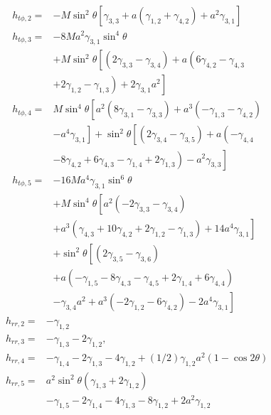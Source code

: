 \begin{eqnarray}
&h_{t\phi,2}=&-M\sin^{2}\theta\left[ \gamma_{3,3}+a\left(\gamma_{1,2}+\gamma_{4,2} \right) +a^{2}\gamma_{3,1} \right] \nonumber\\
&h_{t\phi,3}=&-8Ma^{2}\gamma_{3,1}\sin^{4}\theta \nonumber\\
&&+M\sin^{2}\theta\left[ \left(2\gamma_{3,3}-\gamma_{3,4} \right)+a\left(6\gamma_{4,2}-\gamma_{4,3} \right.\right.\nonumber\\
&&\left.\left.+2\gamma_{1,2}-\gamma_{1,3} \right)+2\gamma_{3,1}a^{2} \right] \nonumber\\
&h_{t\phi,4}= & M\sin^{4}\theta\left[a^{2}\left(8\gamma_{3,1}-\gamma_{3,3} \right)+a^{3}\left(-\gamma_{1,3}-\gamma_{4,2} \right)\right.\nonumber \\
&&\left.-a^{4}\gamma_{3,1} \right] + \sin^{2}\theta \left[  \left( 2\gamma_{3,4}-\gamma_{3,5} \right)+a\left(-\gamma_{4,4}\right.\right.\nonumber\\
&&\left.\left.-8\gamma_{4,2}+6\gamma_{4,3}-\gamma_{1,4}+2\gamma_{1,3} \right)  -a^{2}\gamma_{3,3}  \right] \nonumber\\
&h_{t\phi,5}= & -16Ma^{4}\gamma_{3,1}\sin^{6}\theta\nonumber\\
&&+M\sin^{4}\theta\left[ a^{2}\left(-2\gamma_{3,3}-\gamma_{3,4}\right)\right.\nonumber\\
&&\left.+a^{3}\left(\gamma_{4,3}+10\gamma_{4,2}+2\gamma_{1,2}-\gamma_{1,3}\right) +14a^{4}\gamma_{3,1} \right] \nonumber\\
& &  +\sin^{2}\theta\left[ \left(2\gamma_{3,5}-\gamma_{3,6}\right)\right.\nonumber\\
&&\left.+a\left(-\gamma_{1,5}-8\gamma_{4,3}-\gamma_{4,5}+2\gamma_{1,4}+6\gamma_{4,4}\right) \right. \nonumber\\
& & \left. -\gamma_{3,4}a^{2}+a^{3}\left(-2\gamma_{1,2}-6\gamma_{4,2}\right)-2a^{4}\gamma_{3,1} \right]
\end{eqnarray}
\begin{eqnarray}
&h_{rr,2}=&-\gamma_{1,2}\nonumber\\
&h_{rr,3}=&-\gamma_{1,3}-2\gamma_{1,2}, \nonumber\\
&h_{rr,4}=&-\gamma_{1,4}-2\gamma_{1,3}-4\gamma_{1,2}+(1/2)\gamma_{1,2}a^{2}\left(1-\cos 2\theta \right) \nonumber\\
&h_{rr,5}=&a^{2}\sin^{2}\theta\left(\gamma_{1,3}+2\gamma_{1,2} \right)\nonumber\\
&&-\gamma_{1,5}-2\gamma_{1,4}-4\gamma_{1,3}-8\gamma_{1,2}+2a^{2}\gamma_{1,2} 
\end{eqnarray}
